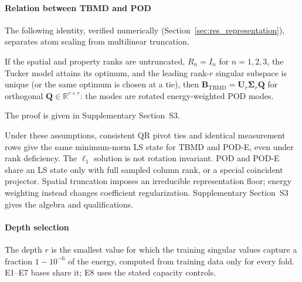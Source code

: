 \paragraph{Relation between TBMD and POD} The following identity, verified numerically (Section~\ref{sec:res_representation}), separates atom scaling from multilinear truncation.

\begin{proposition}
\label{prop:tbmd_pod}
If the spatial and property ranks are untruncated, $R_n=I_n$ for $n=1,2,3$, the Tucker model attains its optimum, and the leading rank-$r$ singular subspace is unique (or the same optimum is chosen at a tie), then $\mathbf{B}_{\mathrm{TBMD}}=\mathbf{U}_r\boldsymbol{\Sigma}_r\mathbf{Q}$ for orthogonal $\mathbf{Q}\in\mathbb{R}^{r\times r}$: the modes are rotated energy-weighted POD modes.
\end{proposition}
The proof is given in Supplementary Section~S3.


Under these assumptions, consistent QR pivot ties and identical measurement rows give the same minimum-norm LS state for TBMD and POD-E, even under rank deficiency. The $\ell_1$ solution is not rotation invariant. POD and POD-E share an LS state only with full sampled column rank, or a special coincident projector. Spatial truncation imposes an irreducible representation floor; energy weighting instead changes coefficient regularization. Supplementary Section~S3 gives the algebra and qualifications.

\paragraph{Depth selection} The depth $r$ is the smallest value for which the training singular values capture a fraction $1-10^{-6}$ of the energy, computed from training data only for every fold. E1--E7 bases share it; E8 uses the stated capacity controls.

